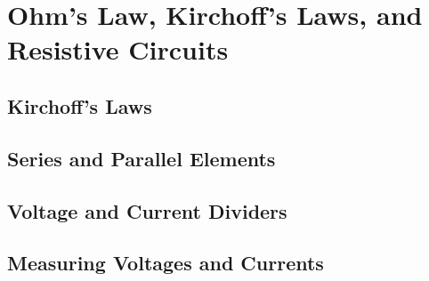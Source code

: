 \chapter{Ohm's Law, Kirchoff's Laws, and Resistive Circuits}
\label{cha:ohms_kirchoff_resistive}
    \section{Kirchoff's Laws}
    \section{Series and Parallel Elements}
    \section{Voltage and Current Dividers}
    \section{Measuring Voltages and Currents}
    